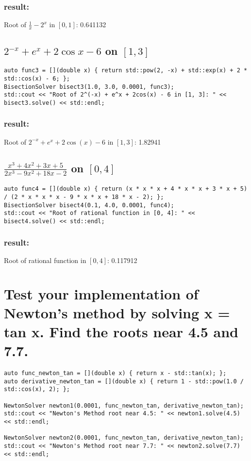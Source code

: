 \documentclass[a4paper]{article}
\begin{document}
\subsubsection*{result:}
Root of $\frac{1}{x} - 2^x$ in $[0, 1]$: 0.641132
\subsection{\( 2^{-x} + e^x + 2 \cos x - 6 \) on \([1, 3]\)}
\begin{lstlisting}
auto func3 = [](double x) { return std::pow(2, -x) + std::exp(x) + 2 * std::cos(x) - 6; };
BisectionSolver bisect3(1.0, 3.0, 0.0001, func3);
std::cout << "Root of 2^(-x) + e^x + 2cos(x) - 6 in [1, 3]: " << bisect3.solve() << std::endl;
\end{lstlisting}
\subsubsection*{result:}
Root of $2^{-x} + e^x + 2\cos(x) - 6$ in $[1, 3]$: 1.82941
\subsection{\( \frac{x^3 + 4x^2 + 3x + 5}{2x^3 - 9x^2 + 18x - 2} \) on \([0, 4]\)}
\begin{lstlisting}
auto func4 = [](double x) { return (x * x * x + 4 * x * x + 3 * x + 5) / (2 * x * x * x - 9 * x * x + 18 * x - 2); };
BisectionSolver bisect4(0.1, 4.0, 0.0001, func4);
std::cout << "Root of rational function in [0, 4]: " << bisect4.solve() << std::endl;    
\end{lstlisting}
\subsubsection*{result:}
Root of rational function in $[0, 4]$: 0.117912
\section{Test your implementation of Newton’s method by solving x = tan x. Find the roots near 4.5 and 7.7.}
\begin{lstlisting}
auto func_newton_tan = [](double x) { return x - std::tan(x); };
auto derivative_newton_tan = [](double x) { return 1 - std::pow(1.0 / std::cos(x), 2); };

NewtonSolver newton1(0.0001, func_newton_tan, derivative_newton_tan);
std::cout << "Newton's Method root near 4.5: " << newton1.solve(4.5) << std::endl;

NewtonSolver newton2(0.0001, func_newton_tan, derivative_newton_tan);
std::cout << "Newton's Method root near 7.7: " << newton2.solve(7.7) << std::endl;
\end{lstlisting}
\end{document}
